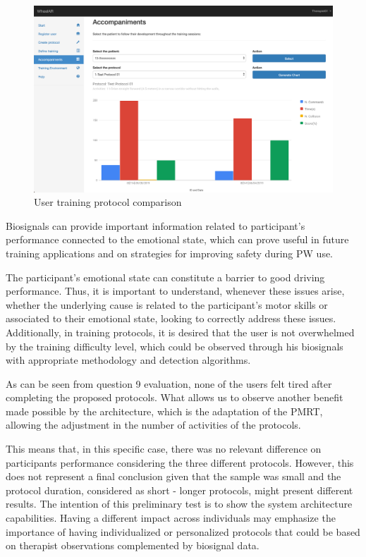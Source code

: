 \begin{figure}[!hbt]
\begin{center}
\includegraphics[width=1\linewidth]{img/cap6/tGenerateChart02}
\caption{User training protocol comparison} \label{fig:tGenerateChart}
\end{center}
\end{figure}


Biosignals can provide important information related to participant’s performance connected to the emotional state, which can prove useful in future training applications and on strategies for improving safety during PW use. 

The participant’s emotional state can constitute a barrier to good driving performance. Thus, it is important to understand, whenever these issues arise, whether the underlying cause is related to the participant’s motor skills or associated to their emotional state, looking to correctly address these issues. Additionally, in training protocols, it is desired that the user is not overwhelmed by the training difficulty level, which could be observed through his biosignals with appropriate methodology and detection algorithms. 

As can be seen from question 9 evaluation, none of the users felt tired after completing the proposed protocols. What allows us to observe another benefit made possible by the architecture, which is the adaptation of the PMRT, allowing the adjustment in the number of activities of the protocols.

This means that, in this specific case, there was no relevant difference on participants performance considering the three different protocols. However, this does not represent a final conclusion given that the sample was small and the protocol duration, considered as short - longer protocols, might present different results. The intention of this preliminary test is to show the system architecture capabilities. Having a different impact across individuals may emphasize the importance of having individualized or personalized protocols that could be based on therapist observations complemented by biosignal data.

